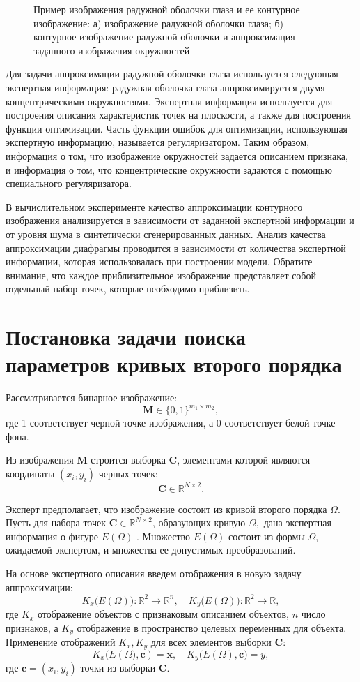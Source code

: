 \begin{figure}[h!]
\caption{Пример изображения радужной оболочки глаза и ее контурное изображение: а) изображение радужной оболочки глаза; б) контурное изображение радужной оболочки и аппроксимация заданного изображения окружностей}
\label{intro:fig1}
\end{figure}

Для задачи аппроксимации радужной оболочки глаза используется следующая экспертная информация: радужная оболочка глаза аппроксимируется двумя концентрическими окружностями. Экспертная информация используется для построения описания характеристик точек на плоскости, а также для построения функции оптимизации. Часть функции ошибок для оптимизации, использующая экспертную информацию, называется регуляризатором. Таким образом, информация о том, что изображение окружностей задается описанием признака, и информация о том, что концентрические окружности задаются с помощью специального регуляризатора.

В вычислительном эксперименте качество аппроксимации контурного изображения анализируется в зависимости от заданной экспертной информации и от уровня шума в синтетически сгенерированных данных. Анализ качества аппроксимации диафрагмы проводится в зависимости от количества экспертной информации, которая использовалась при построении модели. Обратите внимание, что каждое приблизительное изображение представляет собой отдельный набор точек, которые необходимо приблизить.

\section{Постановка задачи поиска параметров кривых второго порядка}
Рассматривается бинарное изображение:
\[
\mathbf{M} \in \{0, 1 \}^{m_1\times m_2},
\]
где 1 соответствует черной точке изображения, а 0 соответствует белой точке фона.

Из изображения $\mathbf{M}$ строится выборка $\mathbf{C}$, элементами которой являются координаты $(x_i, y_i)$ черных точек:
\[
\mathbf{C} \in\mathbb{R}^{N \times 2}.
\]

Эксперт предполагает, что изображение состоит из кривой второго порядка $\Omega$.
Пусть для набора точек $\mathbf{C}\in\mathbb{R}^{N \times 2}$, образующих кривую $\Omega,$ дана экспертная информация о фигуре $E(\Omega)$ .
Множество $E(\Omega)$ состоит из формы $\Omega$, ожидаемой экспертом, и множества ее допустимых преобразований.

На основе экспертного описания введем отображения в новую задачу аппроксимации:
\[
\label{eq1}
	K_{x}\bigl(E(\Omega)\bigr): \mathbb{R}^{2} \rightarrow \mathbb{R}^{n}, \quad K_{y}\bigl(E(\Omega)\bigr): \mathbb{R}^{2} \rightarrow \mathbb{R},
\] 
где $K_{x}$ отображение объектов с признаковым описанием объектов, $n$ число признаков, а $K_{y}$ отображение в пространство целевых переменных для объекта. Применение отображений $K_{x}, K_{y}$ для всех элементов выборки $\mathbf{C}$:
\[
\label{eq2}
	K_{x}\bigl(E(\Omega\bigr), \mathbf{c}) = \mathbf{x}, \quad  K_{y}\bigl(E(\Omega), \mathbf{c}\bigr) = y,
\]
где $\mathbf{c} = (x_i, y_i)$ точки из выборки $\mathbf{C}$.

